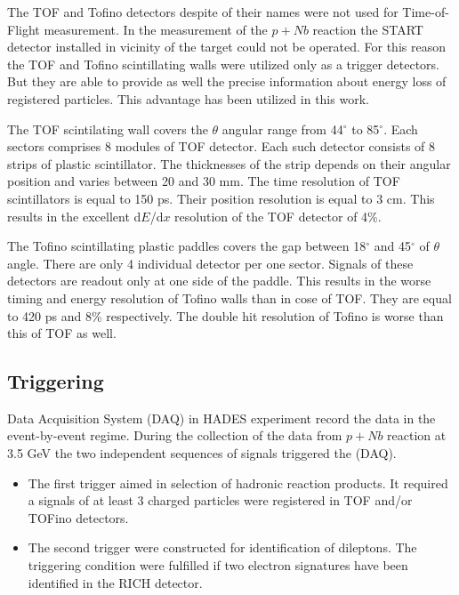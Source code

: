 The TOF and Tofino detectors despite of their names were not used for Time-of-Flight measurement.
In the measurement of the $p+Nb$ reaction the START detector installed in vicinity of the target could not be operated.
For this reason the TOF and Tofino scintillating walls were utilized only as a trigger detectors. 
But they are able to provide as well the precise information about energy loss of registered particles. 
This advantage has been utilized in this work.

The TOF scintilating wall covers the $\theta$ angular range from 44$^{\circ}$ to 85$^{\circ}$. 
Each sectors comprises 8 modules of TOF detector. Each such detector consists of 8 strips of plastic scintillator. 
The thicknesses of the strip depends on their angular position and varies between 20 and 30 mm.
The time resolution of TOF scintillators is equal to 150 ps. Their position resolution is equal to 3 cm.
This results in the excellent d$E$/d$x$ resolution of the TOF detector of 4\%.  

The Tofino scintillating plastic paddles covers the gap between 18$^{\circ}$ and 45$^{\circ}$ of $\theta$ angle.
There are only 4 individual detector per one sector. 
Signals of these detectors are readout only at one side of the paddle. This results 
in the worse timing and energy resolution of Tofino walls than in cose of TOF. 
They are equal to 420 ps and 8\% respectively.
The double hit resolution of Tofino is worse than this of TOF as well.


\subsection{Triggering}

Data Acquisition System (DAQ) in HADES experiment record the data in the event-by-event regime. 
During the collection of the data from $p+Nb$ reaction at 3.5 GeV the two independent sequences of signals triggered the (DAQ).

\begin{itemize}
\item The first trigger aimed in selection of hadronic reaction products. It required a signals of at least 3 charged particles were registered 
in TOF and/or TOFino detectors.  
\item The second trigger were constructed for identification of dileptons. The triggering condition were fulfilled if two electron signatures have been
identified in the RICH detector.
\end{itemize}

